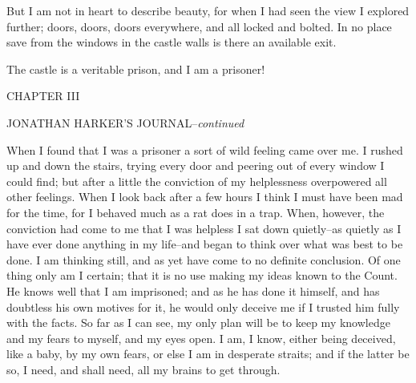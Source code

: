 \documentclass[12pt,openright]{book}
\begin{document}
But I am not in heart to describe beauty, for when I had seen the view I explored further; doors, doors, doors everywhere, and all locked and bolted. In no place save from the windows in the castle walls is there an available exit.

The castle is a veritable prison, and I am a prisoner!

CHAPTER III

JONATHAN HARKER’S JOURNAL–\textit{continued}

When I found that I was a prisoner a sort of wild feeling came over me. I rushed up and down the stairs, trying every door and peering out of every window I could find; but after a little the conviction of my helplessness overpowered all other feelings. When I look back after a few hours I think I must have been mad for the time, for I behaved much as a rat does in a trap. When, however, the conviction had come to me that I was helpless I sat down quietly–as quietly as I have ever done anything in my life–and began to think over what was best to be done. I am thinking still, and as yet have come to no definite conclusion. Of one thing only am I certain; that it is no use making my ideas known to the Count. He knows well that I am imprisoned; and as he has done it himself, and has doubtless his own motives for it, he would only deceive me if I trusted him fully with the facts. So far as I can see, my only plan will be to keep my knowledge and my fears to myself, and my eyes open. I am, I know, either being deceived, like a baby, by my own fears, or else I am in desperate straits; and if the latter be so, I need, and shall need, all my brains to get through.
\end{document}

